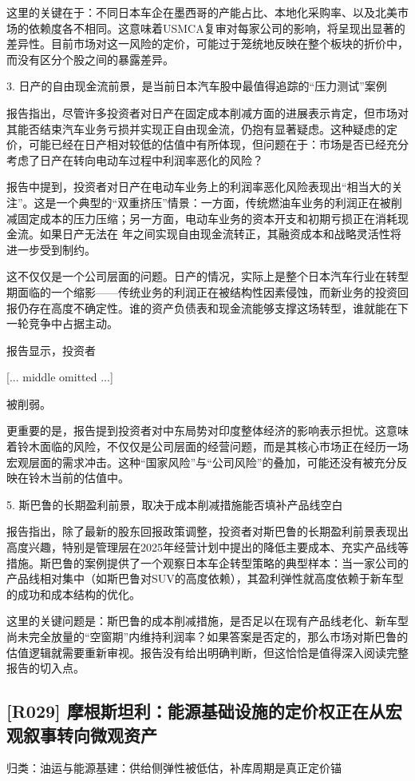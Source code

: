 \documentclass[11pt]{ctexart}
\begin{document}
这里的关键在于：不同日本车企在墨西哥的产能占比、本地化采购率、以及北美市场的依赖度各不相同。这意味着USMCA复审对每家公司的影响，将呈现出显著的差异性。目前市场对这一风险的定价，可能过于笼统地反映在整个板块的折价中，而没有区分个股之间的暴露差异。

3. 日产的自由现金流前景，是当前日本汽车股中最值得追踪的“压力测试”案例

报告指出，尽管许多投资者对日产在固定成本削减方面的进展表示肯定，但市场对其能否结束汽车业务亏损并实现正自由现金流，仍抱有显著疑虑。这种疑虑的定价，可能已经在日产相对较低的估值中有所体现，但问题在于：市场是否已经充分考虑了日产在转向电动车过程中利润率恶化的风险？

报告中提到，投资者对日产在电动车业务上的利润率恶化风险表现出“相当大的关注”。这是一个典型的“双重挤压”情景：一方面，传统燃油车业务的利润正在被削减固定成本的压力压缩；另一方面，电动车业务的资本开支和初期亏损正在消耗现金流。如果日产无法在 年之间实现自由现金流转正，其融资成本和战略灵活性将进一步受到制约。

这不仅仅是一个公司层面的问题。日产的情况，实际上是整个日本汽车行业在转型期面临的一个缩影——传统业务的利润正在被结构性因素侵蚀，而新业务的投资回报仍存在高度不确定性。谁的资产负债表和现金流能够支撑这场转型，谁就能在下一轮竞争中占据主动。

报告显示，投资者

[... middle omitted ...]

被削弱。

更重要的是，报告提到投资者对中东局势对印度整体经济的影响表示担忧。这意味着铃木面临的风险，不仅仅是公司层面的经营问题，而是其核心市场正在经历一场宏观层面的需求冲击。这种“国家风险”与“公司风险”的叠加，可能还没有被充分反映在铃木当前的估值中。

5. 斯巴鲁的长期盈利前景，取决于成本削减措施能否填补产品线空白

报告指出，除了最新的股东回报政策调整，投资者对斯巴鲁的长期盈利前景表现出高度兴趣，特别是管理层在2025年经营计划中提出的降低主要成本、充实产品线等措施。斯巴鲁的案例提供了一个观察日本车企转型策略的典型样本：当一家公司的产品线相对集中（如斯巴鲁对SUV的高度依赖），其盈利弹性就高度依赖于新车型的成功和成本结构的优化。

这里的关键问题是：斯巴鲁的成本削减措施，是否足以在现有产品线老化、新车型尚未完全放量的“空窗期”内维持利润率？如果答案是否定的，那么市场对斯巴鲁的估值逻辑就需要重新审视。报告没有给出明确判断，但这恰恰是值得深入阅读完整报告的切入点。

\subsection{[R029] 摩根斯坦利：能源基础设施的定价权正在从宏观叙事转向微观资产}
{\small\color{refgray}归类：油运与能源基建：供给侧弹性被低估，补库周期是真正定价锚}
\end{document}
